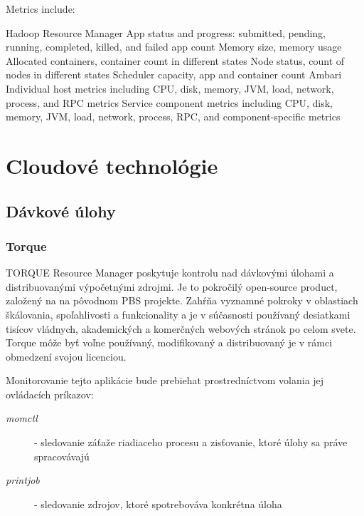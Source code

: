 \documentclass[11pt,final,oneside]{fithesis}
\begin{document}
Metrics include:

Hadoop Resource Manager
App status and progress: submitted, pending, running, completed, killed, and failed app count
Memory size, memory usage
Allocated containers, container count in different states
Node status, count of nodes in different states
Scheduler capacity, app and container count
Ambari
Individual host metrics including CPU, disk, memory, JVM, load, network, process, and RPC metrics
Service component metrics including CPU, disk, memory, JVM, load, network, process, RPC, and component-specific metrics
\cite{17}

\chapter{Cloudové technológie}

\section{Dávkové úlohy}
\subsection{Torque}
TORQUE Resource Manager poskytuje kontrolu nad dávkovými úlohami a distribuovanými výpočetnými zdrojmi. Je to pokročilý open-source product, založený na na pôvodnom PBS projekte. 
Zahŕňa vyznamné pokroky v oblastiach škálovania, spoľahlivosti a funkcionality a je v súčasnosti používaný desiatkami tisícov vládnych, akademických a komerčných webových stránok po celom svete. Torque môže byť voľne používaný, modifikovaný a distribuovaný je v rámci obmedzení svojou licenciou.\cite{torque}

Monitorovanie tejto aplikácie bude prebiehat prostredníctvom volania jej ovládacích príkazov:
\begin{description}
\item[\emph{momctl}] - sledovanie záťaže riadiaceho procesu a zisťovanie, ktoré úlohy sa práve spracovávajú
\item[\emph{printjob}] - sledovanie zdrojov, ktoré spotrebováva konkrétna úloha 
\end{description}
\end{document}
